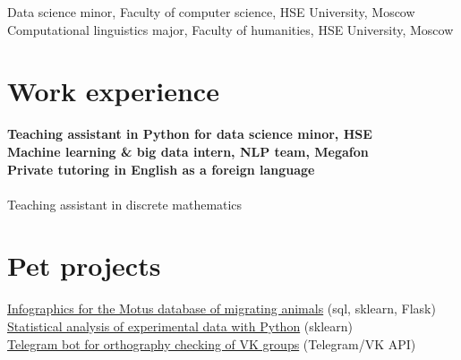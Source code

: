 \documentclass[11pt]{article} %
\begin{document}
 Data science minor, Faculty of computer science, HSE University, Moscow\\
 Computational linguistics major, Faculty of humanities, HSE University, Moscow


\section*{Work experience}

 \textbf{Teaching assistant in Python for data science minor, HSE}\\
 \textbf{Machine learning \& big data intern, NLP team, Megafon}\\
 \textbf{Private tutoring in English as a foreign language}\\
\\
Teaching assistant in discrete mathematics



\section*{Pet projects}

\href{https://github.com/thddbptnsndshs/motustoday}{Infographics for the Motus database of migrating animals} (sql, sklearn, Flask)\\
\href{https://github.com/thddbptnsndshs/idioms}{Statistical analysis of experimental data with Python} (sklearn)\\
\href{https://github.com/thddbptnsndshs/nlzlkskprdstvtljsclnhgrppncnvfrmvgrppvk}{Telegram bot for orthography checking of VK groups} (Telegram/VK API)\\
\end{document}
